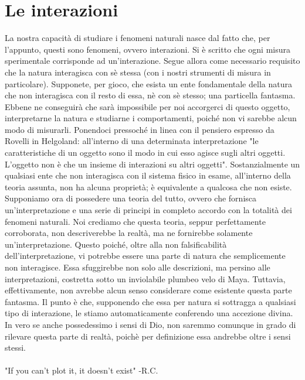 \documentclass[]{article}
\begin{document}
	\section{Le interazioni}
	La nostra capacità di studiare i fenomeni naturali nasce dal fatto che, per l'appunto, questi sono fenomeni, ovvero interazioni. Si è scritto che ogni misura sperimentale corrisponde ad un'interazione. Segue allora come necessario requisito che la natura interagisca con sè stessa (con i nostri strumenti di misura in particolare). Supponete, per gioco, che esista un ente fondamentale della natura che non interagisca con il resto di essa, nè con sè stesso; una particella fantasma. Ebbene ne conseguirà che sarà impossibile per noi accorgerci di questo oggetto, interpretarne la natura e studiarne i comportamenti, poiché non vi sarebbe alcun modo di misurarli. Ponendoci pressoché in linea con il pensiero espresso da Rovelli in Helgoland: all'interno di una determinata interpretazione "le caratteristiche di un oggetto sono il modo in cui esso agisce sugli altri oggetti. L'oggetto non è che un insieme di interazioni su altri oggetti". Sostanzialmente un qualsiasi ente che non interagisca con il sistema fisico in esame, all'interno della teoria assunta, non ha alcuna proprietà; è equivalente a qualcosa che non esiste. \\
	Supponiamo ora di possedere una teoria del tutto, ovvero che fornisca un'interpretazione e una serie di principi in completo accordo con la totalità dei fenomeni naturali. Noi crediamo che questa teoria, seppur perfettamente corroborata, non descriverebbe la realtà, ma ne fornirebbe solamente un'interpretazione. Questo poiché, oltre alla non falsificabilità dell'interpretazione, vi potrebbe essere una parte di natura che semplicemente non interagisce. Essa sfuggirebbe non solo alle descrizioni, ma persino alle interpretazioni, costretta sotto un inviolabile plumbeo velo di Maya. Tuttavia, effettivamente, non avrebbe alcun senso considerare come esistente questa parte fantasma. Il punto è che, supponendo che essa per natura si sottragga a qualsiasi tipo di interazione, le stiamo automaticamente conferendo una accezione divina. In vero se anche possedessimo i sensi di Dio, non saremmo comunque in grado di rilevare questa parte di realtà, poichè per definizione essa andrebbe oltre i sensi stessi.\\
	\\
	"If you can't plot it, it doesn't exist" -R.C.
\end{document}
